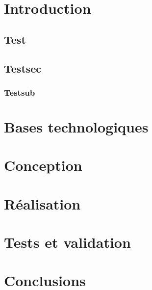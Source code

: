 \documentclass[11pt, a4paper, french, twoside, margin=2cm]{report}
\begin{document}



\tableofcontents


\chapter{Introduction}
\section{Test}
\blindtext

\blindtext
\blindtext
\blindtext
\blindtext
\blindtext
\blindtext
\blindtext
\blindtext
\blindtext
\blindtext
\blindtext
\blindtext
\blindtext
\blindtext
\blindtext
\blindtext
\blindtext
\blindtext
\blindtext

\blindtext

\blindtext

\blindtext

\blindtext
\section{Testsec}
\blindtext
\blindtext
\subsection{Testsub}
\blindtext

\chapter{Bases technologiques}
\blindtext
\chapter{Conception}
\blindtext
\chapter{Réalisation}
\blindtext
\chapter{Tests et validation}
\blindtext

\chapter{Conclusions}
\end{document}
